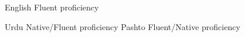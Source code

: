 
\begin{cvskills}

  \cvskill
    {English} %
    {Fluent proficiency} %

  \cvskill
    {Urdu} %
    {Native/Fluent proficiency} %
  \cvskill
    {Pashto} %
    {Fluent/Native proficiency} %

\end{cvskills}
